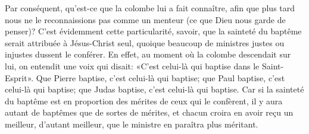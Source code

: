 Par conséquent, qu’est-ce que la colombe lui a fait connaître,
	afin que plus tard nous ne le reconnaissions pas comme un menteur
	(ce que Dieu nous garde de penser)?
C’est évidemment cette particularité,
	savoir, que la sainteté du baptême serait attribuée à Jésus-Christ seul,
	quoique beaucoup de ministres justes ou injustes dussent le conférer.
En effet, au moment où la colombe descendait sur lui,
	on entendit une voix qui disait:
	«C’est celui-là qui baptise dans le Saint-Esprit».
Que Pierre baptise, c’est celui-là qui baptise;
	que Paul baptise, c’est celui-là qui baptise;
	que Judas baptise, c’est celui-là qui baptise.
Car si la sainteté du baptême est en proportion des mérites de ceux qui le confèrent,
	il y aura autant de baptêmes que de sortes de mérites,
	et chacun croira en avoir reçu un meilleur,
		d’autant meilleur, que le ministre en paraîtra plus méritant.
